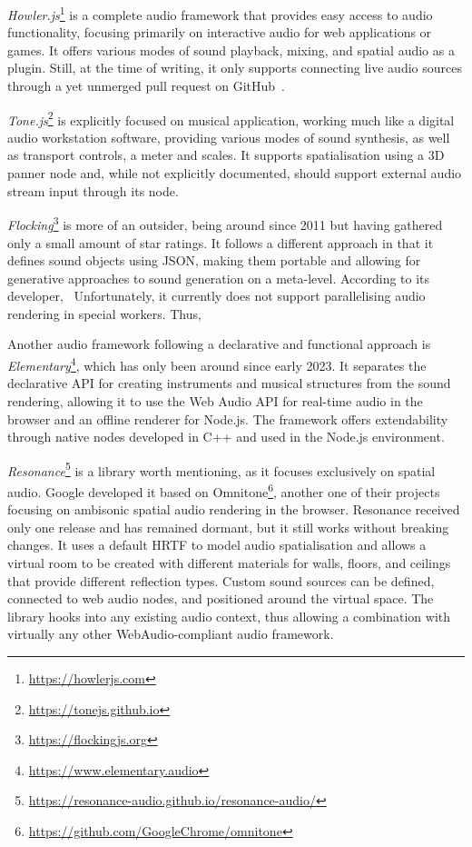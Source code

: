 

\emph{Howler.js}\footnote{\url{https://howlerjs.com}} is a complete audio framework that provides easy access to audio functionality, focusing primarily on interactive audio for web applications or games.
It offers various modes of sound playback, mixing, and spatial audio as a plugin.
Still, at the time of writing, it only supports connecting live audio sources through a yet unmerged pull request on GitHub~\parencite{githubHowlerPullRequest}.

\emph{Tone.js}\footnote{\url{https://tonejs.github.io}} is explicitly focused on musical application, working much like a digital audio workstation software, providing various modes of sound synthesis, as well as transport controls, a meter and scales.
It supports spatialisation using a \ac{3D} panner node and, while not explicitly documented, should support external audio stream input through its  node.

\emph{Flocking}\footnote{\url{https://flockingjs.org}} is more of an outsider, being around since 2011 but having gathered only a small amount of star ratings.
It follows a different approach in that it defines sound objects using \ac{JSON}, making them portable and allowing for generative approaches to sound generation on a meta-level.
According to its developer,~ Unfortunately, it currently does not support parallelising audio rendering in special workers.
Thus,~

Another audio framework following a declarative and functional approach is \emph{Elementary}\footnote{\url{https://www.elementary.audio}}, which has only been around since early 2023.
It separates the declarative \ac{API} for creating instruments and musical structures from the sound rendering, allowing it to use the Web Audio \ac{API} for real-time audio in the browser and an offline renderer for Node.js.
The framework offers extendability through native nodes developed in C++ and used in the Node.js environment.

\emph{Resonance}\footnote{\url{https://resonance-audio.github.io/resonance-audio/}} is a library worth mentioning, as it focuses exclusively on spatial audio.
Google developed it based on Omnitone\footnote{\url{https://github.com/GoogleChrome/omnitone}}, another one of their projects focusing on ambisonic spatial audio rendering in the browser.
Resonance received only one release and has remained dormant, but it still works without breaking changes.
It uses a default \ac{HRTF} to model audio spatialisation and allows a virtual room to be created with different materials for walls, floors, and ceilings that provide different reflection types.
Custom sound sources can be defined, connected to web audio nodes, and positioned around the virtual space.
The library hooks into any existing audio context, thus allowing a combination with virtually any other WebAudio-compliant audio framework.

